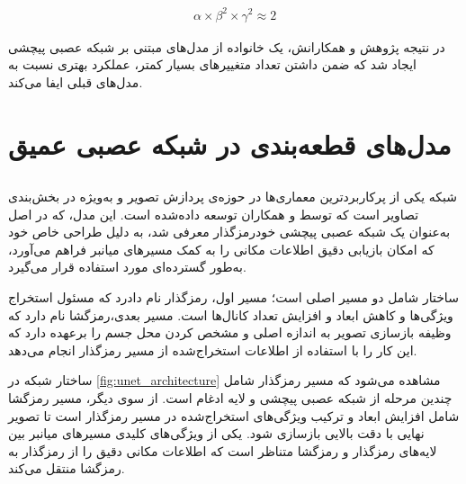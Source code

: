  
\begin{latin}
\begin{equation}
\label{eq:ch2-EffNet}
\begin{aligned}
\alpha \times \beta^2 \times \gamma^2 \approx 2
\end{aligned}
\end{equation}
\end{latin}

 در نتیجه پژوهش 
  و همکارانش، یک خانواده از مدل‌های مبتنی بر شبکه عصبی پیچشی ایجاد شد که ضمن داشتن تعداد متغییرهای بسیار کمتر، عملکرد بهتری نسبت به مدل‌های قبلی ایفا می‌کند.
 

\section{مدل‌های قطعه‌بندی در شبکه عصبی عمیق}

\subsection{}

شبکه
 یکی از پرکاربردترین معماری‌ها در حوزه‌ی پردازش تصویر و به‌ویژه در بخش‌بندی تصاویر است که توسط
 \cite{ronneberger2015u}
 و همکاران توسعه داده‌شده است. این مدل، که در اصل به‌عنوان یک شبکه عصبی پیچشی خودرمزگذار
   معرفی شد، به دلیل طراحی خاص خود که امکان بازیابی دقیق اطلاعات مکانی را به کمک مسیرهای میانبر فراهم می‌آورد، به‌طور گسترده‌ای مورد استفاده قرار می‌گیرد.

ساختار  شامل دو مسیر اصلی است؛ 
مسیر اول، رمزگذار نام دادرد که مسئول استخراج ویژگی‌ها و کاهش ابعاد و افزایش تعداد کانال‌ها است.
مسیر بعدی،‌رمزگشا نام دارد که وظیفه بازسازی تصویر به اندازه اصلی و مشخص کردن محل جسم را برعهده دارد که این کار را با استفاده از اطلاعات استخراج‌شده از مسیر رمزگذار انجام می‌دهد.

ساختار شبکه 
در \autoref{fig:unet_architecture} مشاهده می‌شود که مسیر رمزگذار شامل چندین مرحله از شبکه عصبی پیچشی و لایه ادغام
 است. از سوی دیگر، مسیر رمزگشا شامل افزایش ابعاد و ترکیب ویژگی‌های استخراج‌شده در مسیر رمزگذار است تا تصویر نهایی با دقت بالایی بازسازی شود. یکی از ویژگی‌های کلیدی
  مسیرهای میانبر بین لایه‌های رمزگذار و رمزگشا متناظر است که اطلاعات مکانی دقیق را از رمزگذار به رمزگشا منتقل می‌کند.

